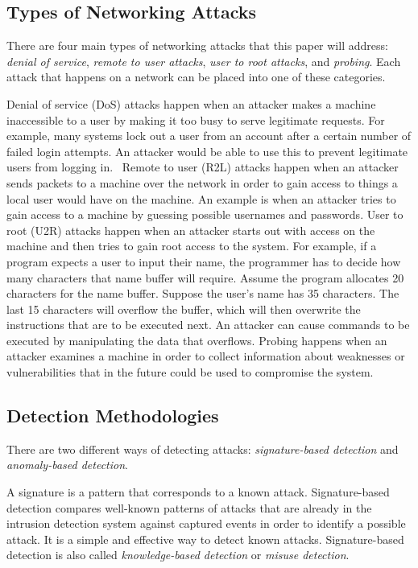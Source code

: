 \documentclass{sig-alternate}
\begin{document}
\subsection{Types of Networking Attacks}
There are four main types of networking attacks that this paper will address: \emph{denial of service}, \emph{remote to user attacks}, \emph{user to root attacks}, and \emph{probing}. Each attack that happens on a network can be placed into one of these categories.~\cite{DBLP:journals/corr/abs-1204-1336}

Denial of service (DoS) attacks happen when an attacker makes a machine inaccessible to a user by making it too busy to serve legitimate requests. For example, many systems lock out a user from an account after a certain number of failed login attempts. An attacker would be able to use this to prevent legitimate users from logging in.~\cite{DoSAttacks} Remote to user (R2L) attacks happen when an attacker sends packets to a machine over the network in order to gain access to things a local user would have on the machine. An example is when an attacker tries to gain access to a machine by guessing possible usernames and passwords. User to root (U2R) attacks happen when an attacker starts out with access on the machine and then tries to gain root access to the system. For example, if a program expects a user to input their name, the programmer has to decide how many characters that name buffer will require. Assume the program allocates 20 characters for the name buffer. Suppose the user's name has 35 characters. The last 15 characters will overflow the buffer, which will then overwrite the instructions that are to be executed next. An attacker can cause commands to be executed by manipulating the data that overflows. Probing happens when an attacker examines a machine in order to collect information about weaknesses or vulnerabilities that in the future could be used to compromise the system.~\cite{DBLP:journals/corr/abs-1204-1336, typesOfAttacks}




\subsection{Detection Methodologies}
There are two different ways of detecting attacks: \emph{signature-based detection} and \emph{anomaly-based detection}. 

A signature is a pattern that corresponds to a known attack. Signature-based detection compares well-known patterns of attacks that are already in the intrusion detection system against captured events in order to identify a possible attack. It is a simple and effective way to detect known attacks. Signature-based detection is also called \emph{knowledge-based detection} or \emph{misuse detection}.~\cite{Liao201316}
\end{document}
